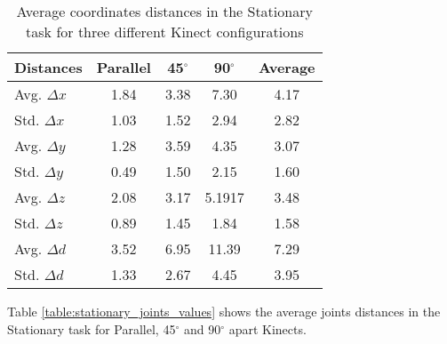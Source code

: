 \begin{table}[!htb]
\centering
\begin{tabularx}{1.0\columnwidth}{||X c c c c||} 
 \hline
 \textbf{Distances} & \textbf{Parallel} & \textbf{45$^{\circ}$} & \textbf{90$^{\circ}$} & \textbf{Average} \\ [0.5ex] 
 \hline\hline
 Avg. $\Delta x$ & 1.84 & 3.38 & 7.30 & 4.17 \\
 \hline
 Std. $\Delta x$ & 1.03 & 1.52 & 2.94 & 2.82 \\
 \hline
 Avg. $\Delta y$ & 1.28 & 3.59 & 4.35 & 3.07 \\
 \hline
 Std. $\Delta y$ & 0.49 & 1.50 & 2.15 & 1.60 \\
 \hline
 Avg. $\Delta z$ & 2.08 & 3.17 & 5.1917 & 3.48 \\
 \hline
 Std. $\Delta z$ & 0.89 & 1.45 & 1.84 & 1.58 \\
 \hline
 Avg. $\Delta d$ & 3.52 & 6.95 & 11.39 & 7.29 \\
 \hline
 Std. $\Delta d$ & 1.33 & 2.67 & 4.45 & 3.95 \\
 \hline
\end{tabularx}
\caption{Average coordinates distances in the Stationary task for three different Kinect configurations}
\label{table:stationary_coordinates_values}
\end{table}

Table \ref{table:stationary_joints_values} shows the average joints distances in the Stationary task for Parallel, 45$^{\circ}$ and 90$^{\circ}$ apart Kinects.

